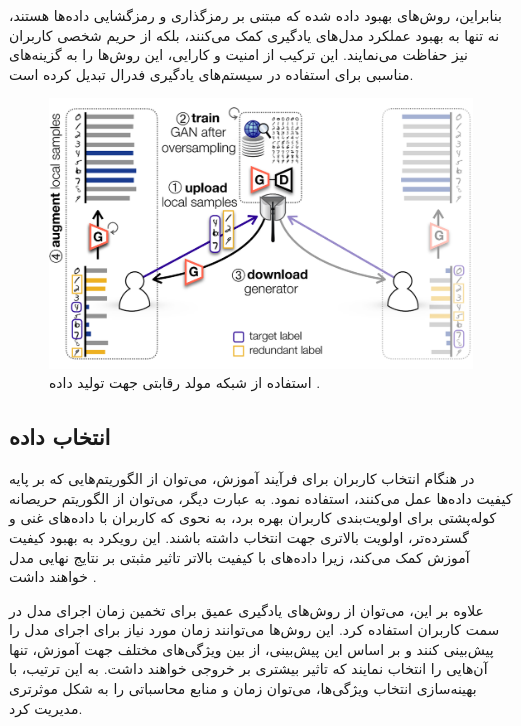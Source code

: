 بنابراین، روش‌های بهبود داده شده که مبتنی بر رمزگذاری و رمزگشایی داده‌ها هستند، نه تنها به بهبود عملکرد مدل‌های یادگیری کمک می‌کنند، بلکه از حریم شخصی کاربران نیز حفاظت می‌نمایند. این ترکیب از امنیت و کارایی، این روش‌ها را به گزینه‌های مناسبی برای استفاده در سیستم‌های یادگیری فدرال تبدیل کرده است.

\begin{figure}[t]
	\centering
	\includegraphics[scale=0.9]{images/chap3/generative_adversarial_network.png}%
	\caption{%
		استفاده از شبکه مولد رقابتی جهت تولید داده
		\cite{jeong2018communication}%
		.
	}
	\label{gan}
	\centering
\end{figure}


\subsection{انتخاب داده}
در هنگام انتخاب کاربران برای فرآیند آموزش، می‌توان از الگوریتم‌هایی که بر پایه کیفیت داده‌ها عمل می‌کنند، استفاده نمود. به عبارت دیگر، می‌توان از الگوریتم حریصانه کوله‌پشتی برای اولویت‌بندی کاربران بهره برد، به نحوی که کاربران با داده‌های غنی و گسترده‌تر، اولویت بالاتری جهت انتخاب داشته باشند. این رویکرد به بهبود کیفیت آموزش کمک می‌کند، زیرا داده‌های با کیفیت بالاتر تاثیر مثبتی بر نتایج نهایی مدل خواهند داشت
\cite{taik2021data}.

علاوه بر این، می‌توان از روش‌های یادگیری عمیق برای تخمین زمان اجرای مدل در سمت کاربران استفاده کرد. این روش‌ها می‌توانند زمان مورد نیاز برای اجرای مدل را پیش‌بینی کنند و بر اساس این پیش‌بینی، از بین ویژگی‌های مختلف جهت آموزش، تنها آن‌هایی را انتخاب نمایند که تاثیر بیشتری بر خروجی خواهند داشت. به این ترتیب، با بهینه‌سازی انتخاب ویژگی‌ها، می‌توان زمان و منابع محاسباتی را به شکل موثرتری مدیریت کرد.

